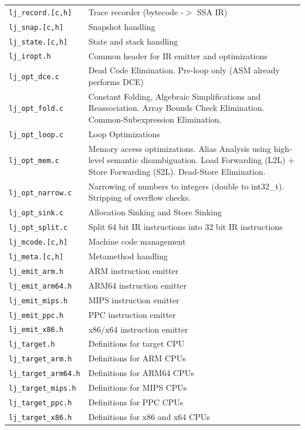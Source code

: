 \begin{center}
\begin{longtable}{|p{4cm}|p{9cm}|}
\hline

\texttt{lj\_record.[c,h]} & Trace recorder (bytecode -$>$ SSA IR)\\
\texttt{lj\_snap.[c,h]} & Snapshot handling\\
\texttt{lj\_state.[c,h]} & State and stack handling\\

\hline

\texttt{lj\_iropt.h} & Common header for IR emitter and optimizations\\
\texttt{lj\_opt\_dce.c} & Dead Code Elimination. Pre-loop only (ASM already performs DCE)\\
\texttt{lj\_opt\_fold.c} & Constant Folding, Algebraic Simplifications and Reassociation. Array Bounds Check Elimination. Common-Subexpression Elimination.\\
\texttt{lj\_opt\_loop.c} & Loop Optimizations\\
\texttt{lj\_opt\_mem.c} & Memory access optimizations. Alias Analysis using high-level semantic disambiguation. Load Forwarding (L2L) + Store Forwarding (S2L). Dead-Store Elimination.\\
\texttt{lj\_opt\_narrow.c} & Narrowing of numbers to integers (double to int32\_t). Stripping of overflow checks.\\
\texttt{lj\_opt\_sink.c} & Allocation Sinking and Store Sinking\\
\texttt{lj\_opt\_split.c} & Split 64 bit IR instructions into 32 bit IR instructions\\

\hline

\texttt{lj\_mcode.[c,h]} & Machine code management\\
\texttt{lj\_meta.[c,h]} & Metamethod handling\\

\hline

\texttt{lj\_emit\_arm.h} & ARM instruction emitter\\
\texttt{lj\_emit\_arm64.h} & ARM64 instruction emitter\\
\texttt{lj\_emit\_mips.h} & MIPS instruction emitter\\
\texttt{lj\_emit\_ppc.h} & PPC instruction emitter\\
\texttt{lj\_emit\_x86.h} & x86/x64 instruction emitter\\

\hline

\texttt{lj\_target.h} & Definitions for target CPU\\
\texttt{lj\_target\_arm.h} & Definitions for ARM CPUs\\
\texttt{lj\_target\_arm64.h} & Definitions for ARM64 CPUs\\
\texttt{lj\_target\_mips.h} & Definitions for MIPS CPUs\\
\texttt{lj\_target\_ppc.h} & Definitions for PPC CPUs\\
\texttt{lj\_target\_x86.h} & Definitions for x86 and x64 CPUs\\


\end{longtable}
\end{center}
